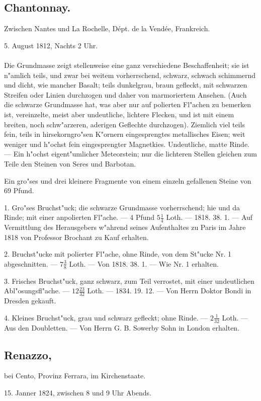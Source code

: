 \documentclass[a4paper, 11pt, oneside, polutonikogreek, german]{article}
\begin{document}
\subsection{Chantonnay.}
\begin{center}
\small
Zwischen Nantes und La Rochelle, Dépt. de la Vendée, Frankreich.

5. August 1812, Nachts 2 Uhr.
\end{center}
\paragraph{}
Die Grundmasse zeigt stellenweise eine ganz verschiedene Beschaffenheit; sie ist n"amlich teils, und zwar bei weitem vorherrschend, schwarz, schwach schimmernd und dicht, wie mancher Basalt; teils dunkelgrau, braun gefleckt, mit schwarzen Streifen oder Linien durchzogen und daher von marmoriertem Ansehen. (Auch die schwarze Grundmasse hat, was aber nur auf polierten Fl"achen zu bemerken ist, vereinzelte, meist aber undeutliche, lichtere Flecken, und ist mit einem breiten, noch schw"arzeren, aderigen Geflechte durchzogen). Ziemlich viel teils fein, teils in hirsekorngro"sen K"ornern eingesprengtes metallisches Eisen; weit weniger und h"ochst fein eingesprengter Magnetkies. Undeutliche, matte Rinde. --- Ein h"ochst eigent"umlicher Meteorstein; nur die lichteren Stellen gleichen zum Teile den Steinen von Seres und Barbotan.

Ein gro"ses und drei kleinere Fragmente von einem einzeln gefallenen Steine von 69 Pfund.

1. Gro"ses Bruchst"uck; die schwarze Grundmasse vorherrschend; hie und da Rinde; mit einer anpolierten Fl"ache. --- 4 Pfund $5\frac{1}{4}$ Loth. --- 1818. 38. 1. --- Auf Vermittlung des Herausgebers w"ahrend seines Aufenthaltes zu Paris im Jahre 1818 von Professor Brochant zu Kauf erhalten.

2. Bruchst"ucke mit polierter Fl"ache, ohne Rinde, von dem St"ucke Nr. 1 abgeschnitten. --- $7\frac{3}{8}$ Loth. --- Von 1818. 38. 1. --- Wie Nr. 1 erhalten.

3. Frisches Bruchst"uck, ganz schwarz, zum Teil verrostet, mit einer undeutlichen Abl"osungsfl"ache. --- $12\frac{23}{32}$ Loth. --- 1834. 19. 12. --- Von Herrn Doktor Bondi in Dresden gekauft.

4. Kleines Bruchst"uck, grau und schwarz gefleckt; ohne Rinde. --- $2\frac{1}{32}$ Loth. --- Aus den Doubletten. --- Von Herrn G. B. Sowerby Sohn in London erhalten.
\subsection[Renazzo.]{Renazzo,}
\begin{center}
\small
bei Cento, Provinz Ferrara, im Kirchenstaate.

15. Janner 1824, zwischen 8 und 9 Uhr Abends.
\end{center}
\end{document}
